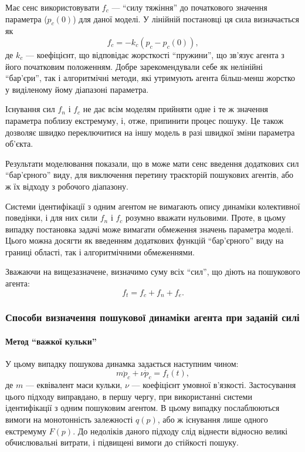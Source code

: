 Має сенс використовувати $f_c$ --- ``силу тяжіння'' до початкового значення параметра
($p_{c}(0)$) для даної моделі. У лінійній постановці ця сила визначається як
%
\begin{equation}
  f_c = -k_c (p_c - p_{c}(0)) ,
  \label{atu:eq:f_c}
\end{equation}
%
де $k_c$ --- коефіцієнт, що відповідає жорсткості ``пружини'',
що зв'язує агента з його початковим положенням.
Добре зарекомендували себе як нелінійні ``бар'єри'',
так і алгоритмічні методи, які утримують агента
більш-менш жорстко у виділеному йому діапазоні параметра.

Існування сил
$f_n$ і $f_c$
не дає всім моделям прийняти одне і те ж значення параметра
поблизу екстремуму, і, отже, припинити процес пошуку. Це також
дозволяє швидко переключитися на іншу модель в разі швидкої
зміни параметра об'єкта.

Результати моделювання показали, що в може мати
сенс введення додаткових сил ``бар'єрного'' виду, для виключення
перетину траєкторій пошукових агентів, або ж їх відходу з
робочого діапазону.

Системи ідентифікації з одним агентом не вимагають опису
динаміки колективної поведінки, і для них сили
$f_n$ і
$f_c$ розумно вважати нульовими. Проте, в цьому випадку постановка
задачі може вимагати обмеження значень параметра моделі. Цього
можна досягти як введенням додаткових функцій ``бар'єрного''
виду на границі області, так і алгоритмічними обмеженнями.

Зважаючи на вищезазначене, визначимо суму всіх ``сил'',
що діють на пошукового агента:
\begin{equation}
  f_t = f_c + f_n + f_e .
  \label{atu:eq:f_t}
\end{equation}






\subsubsection{Способи визначення пошукової динаміки агента при заданій силі}  %

\paragraph{Метод ``важкої кульки''}

У цьому випадку пошукова динамка задається наступним чином:
%
\begin{equation}
  m \ddot{p}_c + \nu \dot{p}_c = f_t(t),
  \label{atu:eq:heavy_ball}
\end{equation}
%
де $m$ --- еквівалент маси кульки, $\nu$ --- коефіцієнт умовної в'язкості.
%
Застосування цього підходу виправдано, в першу чергу, при
використанні системи ідентифікації з одним пошуковим агентом. В
цьому випадку послаблюються вимоги на монотонність залежності
$q(p)$, або ж існування лише одного екстремуму
$F(p)$. До недоліків даного підходу слід віднести відносно великі
обчислювальні витрати, і підвищені вимоги до стійкості пошуку.


